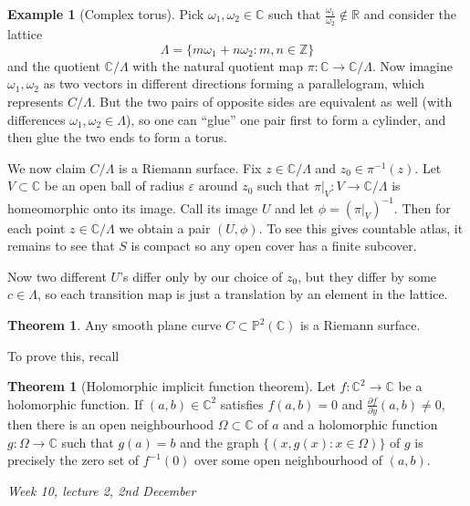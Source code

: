 \documentclass{article}
\newcommand{\Z}{\mathbb{Z}}
\newcommand{\R}{\mathbb{R}}
\newcommand{\C}{\mathbb{C}}
\newcommand{\p}{\mathbb{P}}
\theoremstyle{definition}
\newtheorem{thm}[defn]{Theorem}
\newtheorem{example}[defn]{Example}
\begin{document}
\begin{example}[Complex torus]
Pick $\omega_1,\omega_2\in\C$ such that $\frac{\omega_1}{\omega_2}\notin\R$ and consider the lattice
\[
\Lambda=\{m\omega_1+n\omega_2:m,n\in\Z\}
\]
and the quotient $\C/\Lambda$ with the natural quotient map $\pi:\C\rightarrow\C/\Lambda$. Now imagine $\omega_1,\omega_2$ as two vectors in different directions forming a parallelogram, which represents $C/\Lambda$. But the two pairs of opposite sides are equivalent as well (with differences $\omega_1,\omega_2\in\Lambda$), so one can ``glue'' one pair first to form a cylinder, and then glue the two ends to form a torus.

We now claim $C/\Lambda$ is a Riemann surface. Fix $z\in\C/\Lambda$ and $z_0\in\pi^{-1}(z)$. Let $V\subset\C$ be an open ball of radius $\varepsilon$ around $z_0$ such that $\left.\pi\right|_{V}:V\rightarrow\C/\Lambda$ is homeomorphic onto its image. Call its image $U$ and let $\phi=\left(\left.\pi\right|_V\right)^{-1}$. Then for each point $z\in\C/\Lambda$ we obtain a pair $(U,\phi)$. To see this gives countable atlas, it remains to see that $S$ is compact so any open cover has a finite subcover.

Now two different $U$'s differ only by our choice of $z_0$, but they differ by some $c\in\Lambda$, so each transition map is just a translation by an element in the lattice.
\end{example}

\begin{thm}
\label{thm:smoothcurvesareRiemsurf}
Any smooth plane curve $C\subset\p^2(\C)$ is a Riemann surface.
\end{thm}

To prove this, recall
\begin{thm}[Holomorphic implicit function theorem]
Let $f:\C^2\rightarrow\C$ be a holomorphic function. If $(a,b)\in\C^2$ satisfies $f(a,b)=0$ and $\frac{\partial f}{\partial y}(a,b)\neq 0$, then there is an open neighbourhood $\Omega\subset\C$ of $a$ and a holomorphic function $g:\Omega\rightarrow\C$ such that $g(a)=b$ and the graph $\{(x,g(x):x\in\Omega)\}$ of $g$ is precisely the zero set of $f^{-1}(0)$ over some open neighbourhood of $(a,b)$.
\end{thm}

\begin{flushright}
\textit{Week 10, lecture 2, 2nd December}
\end{flushright}
\end{document}
